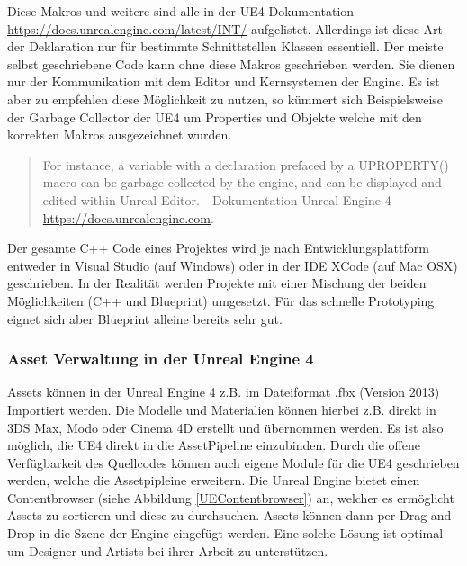 \documentclass[pagesize, paper=a4, fontsize=12pt, titlepage=true, headings=small, headnosepline, abstractoff, liststotoc, nochapterprefix, plainheadsepline, twoside]{scrreprt}
\begin{document}


Diese Makros und weitere sind alle in der UE4 Dokumentation \url{https://docs.unrealengine.com/latest/INT/} aufgelistet. Allerdings ist diese Art der Deklaration nur für bestimmte Schnittstellen Klassen essentiell. Der meiste selbst geschriebene Code kann ohne diese Makros geschrieben werden. Sie dienen nur der Kommunikation mit dem Editor und Kernsystemen der Engine. Es ist aber zu empfehlen diese Möglichkeit zu nutzen, so kümmert sich Beispielsweise der Garbage Collector der UE4 um Properties und Objekte welche mit den korrekten Makros ausgezeichnet wurden. 
\begin{quote}
For instance, a variable with a declaration prefaced by a UPROPERTY() macro can be garbage collected by the engine, and can be displayed and edited within Unreal Editor. \autocite{UnrealEngine4} - Dokumentation Unreal Engine 4 \url{https://docs.unrealengine.com}.
\end{quote}
Der gesamte C++ Code eines Projektes wird je nach Entwicklungsplattform entweder in Visual Studio (auf Windows) oder in der IDE XCode (auf Mac OSX) geschrieben. In der Realität werden Projekte mit einer Mischung der beiden Möglichkeiten (C++ und Blueprint) umgesetzt. Für das schnelle Prototyping eignet sich aber Blueprint alleine bereits sehr gut.

\subsubsection{Asset Verwaltung in der Unreal Engine 4}
Assets können in der Unreal Engine 4  z.B. im Dateiformat .fbx (Version 2013) Importiert werden. Die Modelle und Materialien können hierbei z.B. direkt in 3DS Max, Modo oder Cinema 4D erstellt und übernommen werden. Es ist also möglich, die UE4 direkt in die AssetPipeline einzubinden. Durch die offene Verfügbarkeit des Quellcodes können auch eigene Module für die UE4 geschrieben werden, welche die Assetpipleine erweitern. Die Unreal Engine bietet einen Contentbrowser (siehe Abbildung \ref{UEContentbrowser}) an, welcher es ermöglicht Assets zu sortieren und diese zu durchsuchen. Assets können dann per Drag and Drop in die Szene der Engine eingefügt werden. Eine solche Lösung ist optimal um Designer und Artists bei ihrer Arbeit zu unterstützen.
\end{document}
